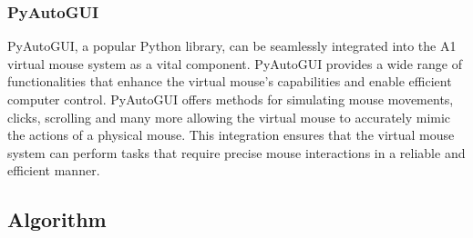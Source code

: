 \documentclass[12pt,a4paper]{report}
\begin{document}
	\subsubsection{PyAutoGUI}
	{
		PyAutoGUI, a popular Python library, can be seamlessly integrated into the A1 virtual mouse system as a vital component. PyAutoGUI provides a wide range of functionalities that enhance the virtual mouse's capabilities and enable efficient computer control. PyAutoGUI offers methods for simulating mouse movements, clicks, scrolling and many more allowing the virtual mouse to accurately mimic the actions of a physical mouse. This integration ensures that the virtual mouse system can perform tasks that require precise mouse interactions in a reliable and efficient manner. 
	}
	\label{Algorithm }
	\subsection{Algorithm }
\end{document}

